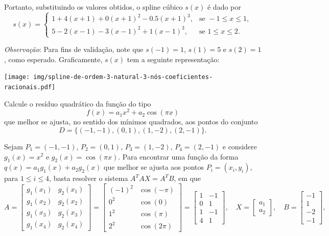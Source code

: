 \documentclass[12pt,a4paper]{article}
\begin{document}
\begin{ExerciseList}
Portanto, substituindo os valores obtidos, o spline cúbico \( s(x) \) é dado por
\[
\boxed{
  s(x) =
  \begin{cases}
    1 + 4(x + 1) + 0(x + 1)^2 - 0.5(x + 1)^3, & \text{se } -1 \leq x \leq 1,\\
    5 - 2(x - 1) - 3(x - 1)^2 + 1(x - 1)^3, & \text{se } 1 \leq x \leq 2.
  \end{cases}
}
\]

\textit{Observação}: Para fins de validação, note que \( s(-1) = 1 \), \( s(1) = 5 \) e \( s(2) = 1 \), como esperado. Graficamente, $s(x)$ tem a seguinte representação:

\begin{center}
  \texttt{[image: img/spline-de-ordem-3-natural-3-nós-coeficientes-racionais.pdf]}
\end{center}


\Exercise[title={2,5}] Calcule o resíduo quadrático da função do tipo
\[
f(x) = a_1 x^2 + a_2 \cos(\pi x)
\]
que melhor se ajusta, no sentido dos mínimos quadrados, aos pontos do conjunto
\[
D = \{(-1, -1), (0, 1), (1, -2), (2, -1)\}.
\]

\Answer
Sejam $P_1 = (-1, -1)$, $P_2 = (0, 1)$, $P_3 = (1, -2)$, $P_4 = (2, -1)$ e considere $g_1(x) = x^2$ e $g_2(x) = \cos(\pi x)$. Para encontrar uma função da forma $q(x) = a_1 g_1(x) + a_2 g_2(x)$ que melhor se ajusta aos pontos $P_i = (x_i, y_i)$, para $1 \leq i \leq 4$, basta resolver o sistema $A^T A X = A^T B$, em que
\[
A =
\begin{bmatrix}
g_1(x_1) & g_2(x_1) \\
g_1(x_2) & g_2(x_2) \\
g_1(x_3) & g_2(x_3) \\
g_1(x_4) & g_2(x_4)
\end{bmatrix}
=
\begin{bmatrix}
(-1)^2 & \cos(-\pi) \\
0^2 & \cos(0) \\
1^2 & \cos(\pi) \\
2^2 & \cos(2\pi)
\end{bmatrix}
=
\begin{bmatrix}
1 & -1 \\
0 &  1 \\
1 & -1 \\
4 &  1
\end{bmatrix},
\quad
X =
\begin{bmatrix}
a_1\\a_2
\end{bmatrix},
\quad
B =
\begin{bmatrix}
-1 \\
1 \\
-2 \\
-1
\end{bmatrix},
\]


\end{ExerciseList}
\end{document}
